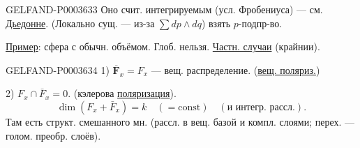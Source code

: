 \begin{GelfandAdjacentEvidence}{GELFAND-P000363}{3}
Оно счит. интегрируемым (усл. Фробениуса) --- см. \uline{Дьедонне}.
(Локально сущ. --- из-за $\sum dp\wedge dq$) взять $p$-подпр-во.



\end{GelfandAdjacentEvidence}

\uline{Пример}: сфера с обычн. объёмом. Глоб. нельзя.
\uline{Частн. случаи} (крайнии).

\begin{GelfandAdjacentEvidence}{GELFAND-P000363}{4}
1) $\overline{\boldsymbol F}_x=F_x$ --- вещ. распределение. (\uline{вещ. поляриз.})
\end{GelfandAdjacentEvidence}

2) $F_x\cap\bar F_x=0.$ (кэлерова \uline{поляризация}).
\begin{equation*}\dim(F_x+\bar F_x)=k\quad(=\mathrm{const})\quad(\text{и интегр. рассл.}).\end{equation*}
Там есть структ. смешанного мн. (рассл. в вещ. базой и компл. слоями; перех. --- голом. преобр. слоёв).


